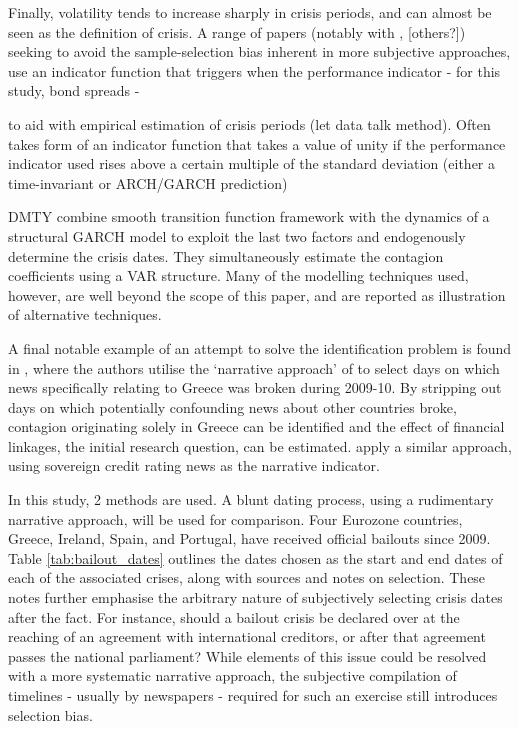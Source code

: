 \documentclass[../base.tex]{subfiles}
\begin{document}
Finally, volatility tends to increase sharply in crisis periods, and can almost be seen as the definition of crisis. A range of papers (notably with \cite{eichengreen1996contagious}, [others?]) seeking to avoid the sample-selection bias inherent in more subjective approaches, use an indicator function that triggers when the performance indicator - for this study, bond spreads - 

 to aid with empirical estimation of crisis periods (let data talk method). Often takes form of an indicator function that takes a value of unity if the performance indicator used rises above a certain multiple of the standard deviation (either a time-invariant or ARCH/GARCH prediction)

DMTY combine smooth transition function framework with the dynamics of a structural GARCH model to exploit the last two factors and endogenously determine the crisis dates. They simultaneously estimate the contagion coefficients using a VAR structure. Many of the modelling techniques used, however, are well beyond the scope of this paper, and are reported as illustration of alternative techniques.

A final notable example of an attempt to solve the identification problem is found in \cite{brutti2012transmission}, where the authors utilise the `narrative approach' of \cite{romer1989does} to select days on which news specifically relating to Greece was broken during 2009-10. By stripping out days on which potentially confounding news about other countries broke, contagion originating solely in Greece can be identified and the effect of financial linkages, the initial research question, can be estimated. \cite{arezki2011sovereign} apply a similar approach, using sovereign credit rating news as the narrative indicator. 



In this study, 2 methods are used. A blunt dating process, using a rudimentary narrative approach, will be used for comparison. Four Eurozone countries, Greece, Ireland, Spain, and Portugal, have received official bailouts since 2009. Table \ref{tab:bailout_dates} outlines the dates chosen as the start and end dates of each of the associated crises, along with sources and notes on selection. These notes further emphasise the arbitrary nature of subjectively selecting crisis dates after the fact. For instance, should a bailout crisis be declared over at the reaching of an agreement with international creditors, or after that agreement passes the national parliament? While elements of this issue could be resolved with a more systematic narrative approach, the subjective compilation of timelines - usually by newspapers - required for such an exercise still introduces selection bias. 
\end{document}
